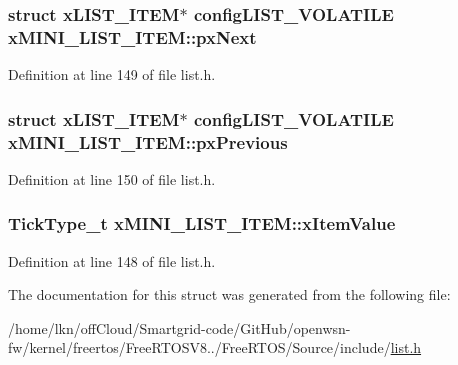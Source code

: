 \subsubsection[{\texorpdfstring{px\+Next}{pxNext}}]{\setlength{\rightskip}{0pt plus 5cm}struct {\bf x\+L\+I\+S\+T\+\_\+\+I\+T\+EM}$\ast$ {\bf config\+L\+I\+S\+T\+\_\+\+V\+O\+L\+A\+T\+I\+LE} x\+M\+I\+N\+I\+\_\+\+L\+I\+S\+T\+\_\+\+I\+T\+E\+M\+::px\+Next}\hypertarget{structx_m_i_n_i___l_i_s_t___i_t_e_m_aa7ae770b0f10daeb9ac76c6f7dd5608e}{}\label{structx_m_i_n_i___l_i_s_t___i_t_e_m_aa7ae770b0f10daeb9ac76c6f7dd5608e}


Definition at line 149 of file list.\+h.

\subsubsection[{\texorpdfstring{px\+Previous}{pxPrevious}}]{\setlength{\rightskip}{0pt plus 5cm}struct {\bf x\+L\+I\+S\+T\+\_\+\+I\+T\+EM}$\ast$ {\bf config\+L\+I\+S\+T\+\_\+\+V\+O\+L\+A\+T\+I\+LE} x\+M\+I\+N\+I\+\_\+\+L\+I\+S\+T\+\_\+\+I\+T\+E\+M\+::px\+Previous}\hypertarget{structx_m_i_n_i___l_i_s_t___i_t_e_m_a732c666bb97560eb1b094a2c411269ab}{}\label{structx_m_i_n_i___l_i_s_t___i_t_e_m_a732c666bb97560eb1b094a2c411269ab}


Definition at line 150 of file list.\+h.

\subsubsection[{\texorpdfstring{x\+Item\+Value}{xItemValue}}]{ {\bf Tick\+Type\+\_\+t} x\+M\+I\+N\+I\+\_\+\+L\+I\+S\+T\+\_\+\+I\+T\+E\+M\+::x\+Item\+Value}\hypertarget{structx_m_i_n_i___l_i_s_t___i_t_e_m_a0d87493ffe2e7ff2e3218262e57826c9}{}\label{structx_m_i_n_i___l_i_s_t___i_t_e_m_a0d87493ffe2e7ff2e3218262e57826c9}


Definition at line 148 of file list.\+h.



The documentation for this struct was generated from the following file\+:\begin{DoxyCompactItemize}
\item 
/home/lkn/off\+Cloud/\+Smartgrid-\/code/\+Git\+Hub/openwsn-\/fw/kernel/freertos/\+Free\+R\+T\+O\+S\+V8../\+Free\+R\+T\+O\+S/\+Source/include/\hyperlink{list_8h}{list.\+h}\end{DoxyCompactItemize}
